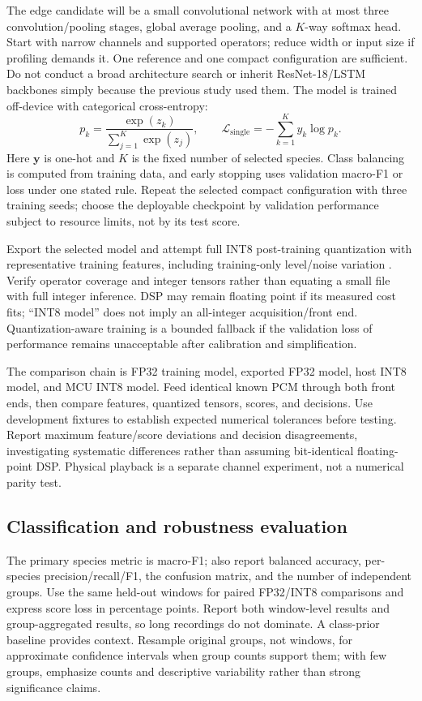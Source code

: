 \documentclass[a4paper,11pt]{article}
\begin{document}
The edge candidate will be a small convolutional network with at most three convolution/pooling stages, global average pooling, and a $K$-way softmax head. Start with narrow channels and supported operators; reduce width or input size if profiling demands it. One reference and one compact configuration are sufficient. Do not conduct a broad architecture search or inherit ResNet-18/LSTM backbones simply because the previous study used them. The model is trained off-device with categorical cross-entropy:
\begin{equation}
 p_k=\frac{\exp(z_k)}{\sum_{j=1}^{K}\exp(z_j)},\qquad
 \mathcal{L}_{\mathrm{single}}=-\sum_{k=1}^{K}y_k\log p_k .
\end{equation}
Here $\mathbf{y}$ is one-hot and $K$ is the fixed number of selected species. Class balancing is computed from training data, and early stopping uses validation macro-F1 or loss under one stated rule. Repeat the selected compact configuration with three training seeds; choose the deployable checkpoint by validation performance subject to resource limits, not by its test score.

Export the selected model and attempt full INT8 post-training quantization with representative training features, including training-only level/noise variation \cite{quantization}. Verify operator coverage and integer tensors rather than equating a small file with full integer inference. DSP may remain floating point if its measured cost fits; ``INT8 model'' does not imply an all-integer acquisition/front end. Quantization-aware training is a bounded fallback if the validation loss of performance remains unacceptable after calibration and simplification.

The comparison chain is FP32 training model, exported FP32 model, host INT8 model, and MCU INT8 model. Feed identical known PCM through both front ends, then compare features, quantized tensors, scores, and decisions. Use development fixtures to establish expected numerical tolerances before testing. Report maximum feature/score deviations and decision disagreements, investigating systematic differences rather than assuming bit-identical floating-point DSP. Physical playback is a separate channel experiment, not a numerical parity test.

\subsection{Classification and robustness evaluation}
The primary species metric is macro-F1; also report balanced accuracy, per-species precision/recall/F1, the confusion matrix, and the number of independent groups. Use the same held-out windows for paired FP32/INT8 comparisons and express score loss in percentage points. Report both window-level results and group-aggregated results, so long recordings do not dominate. A class-prior baseline provides context. Resample original groups, not windows, for approximate confidence intervals when group counts support them; with few groups, emphasize counts and descriptive variability rather than strong significance claims.
\end{document}
